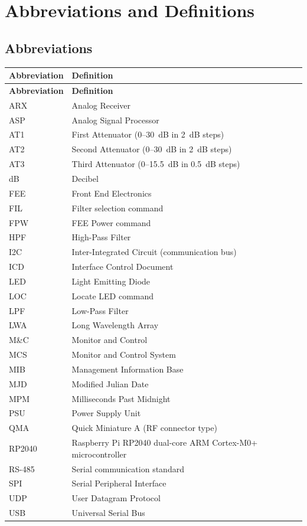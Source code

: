 
\chapter{Abbreviations and Definitions}
\label{sec:abbreviations}

\section{Abbreviations}

\begin{longtable}{p{3cm}p{10cm}}
    \toprule
    \textbf{Abbreviation} & \textbf{Definition} \\
    \midrule
    \endfirsthead

    \toprule
    \textbf{Abbreviation} & \textbf{Definition} \\
    \midrule
    \endhead

    \bottomrule
    \endfoot

    ARX & Analog Receiver \\
    ASP & Analog Signal Processor \\
    AT1 & First Attenuator (0--30~dB in 2~dB steps) \\
    AT2 & Second Attenuator (0--30~dB in 2~dB steps) \\
    AT3 & Third Attenuator (0--15.5~dB in 0.5~dB steps) \\
    dB & Decibel \\
    FEE & Front End Electronics \\
    FIL & Filter selection command \\
    FPW & FEE Power command \\
    HPF & High-Pass Filter \\
    I2C & Inter-Integrated Circuit (communication bus) \\
    ICD & Interface Control Document \\
    LED & Light Emitting Diode \\
    LOC & Locate LED command \\
    LPF & Low-Pass Filter \\
    LWA & Long Wavelength Array \\
    M\&C & Monitor and Control \\
    MCS & Monitor and Control System \\
    MIB & Management Information Base \\
    MJD & Modified Julian Date \\
    MPM & Milliseconds Past Midnight \\
    PSU & Power Supply Unit \\
    QMA & Quick Miniature A (RF connector type) \\
    RP2040 & Raspberry Pi RP2040 dual-core ARM Cortex-M0+ microcontroller \\
    RS-485 & Serial communication standard \\
    SPI & Serial Peripheral Interface \\
    UDP & User Datagram Protocol \\
    USB & Universal Serial Bus \\


\end{longtable}
